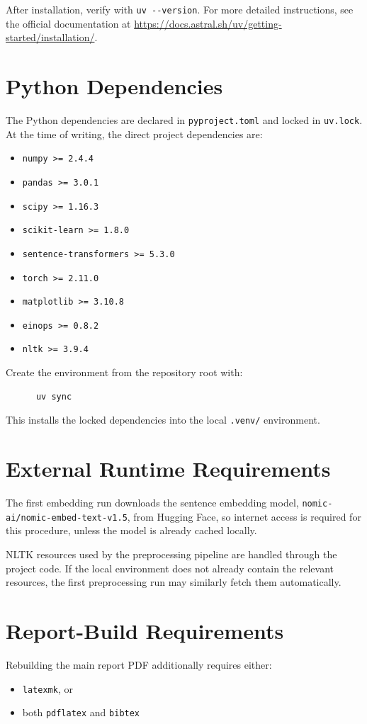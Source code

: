 \documentclass[10pt,a4paper]{article}
\begin{document}
After installation, verify with \texttt{uv -{}-version}. For more detailed instructions, see the official documentation at \url{https://docs.astral.sh/uv/getting-started/installation/}.

\section{Python Dependencies}
The Python dependencies are declared in \texttt{pyproject.toml} and locked in \texttt{uv.lock}. At the time of writing, the direct project dependencies are:

\begin{itemize}
\item \texttt{numpy >= 2.4.4}
\item \texttt{pandas >= 3.0.1}
\item \texttt{scipy >= 1.16.3}
\item \texttt{scikit-learn >= 1.8.0}
\item \texttt{sentence-transformers >= 5.3.0}
\item \texttt{torch >= 2.11.0}
\item \texttt{matplotlib >= 3.10.8}
\item \texttt{einops >= 0.8.2}
\item \texttt{nltk >= 3.9.4}
\end{itemize}

Create the environment from the repository root with:

\begin{verbatim}
      uv sync
\end{verbatim}

This installs the locked dependencies into the local \texttt{.venv/} environment.

\section{External Runtime Requirements}
The first embedding run downloads the sentence embedding model, \texttt{nomic-ai/nomic-embed-text-v1.5}, from Hugging Face, so internet access is required for this procedure, unless the model is already cached locally.

NLTK resources used by the preprocessing pipeline are handled through the project code. If the local environment does not already contain the relevant resources, the first preprocessing run may similarly fetch them automatically.

\section{Report-Build Requirements}
Rebuilding the main report PDF additionally requires either:
\begin{itemize}
      \item \texttt{latexmk}, or
      \item both \texttt{pdflatex} and \texttt{bibtex}
\end{itemize}
\end{document}

